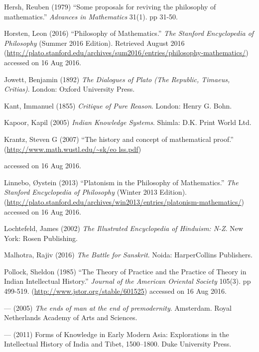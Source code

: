 \begin{thebibliography}{99}
Hersh, Reuben (1979) ``Some proposals for reviving the philosophy of mathematics.'' {\sl Advances in Mathematics} 31(1). pp 31-50.

Horsten, Leon (2016) ``Philosophy of Mathematics.'' {\sl The Stanford Encyclopedia of Philosophy} (Summer 2016 Edition). Retrieved August 2016 (\url{http://plato.stanford.edu/archives/sum2016/entries/philosophy-mathematics/}) accessed on 16 Aug 2016.

Jowett, Benjamin (1892) {\sl The Dialogues of Plato (The Republic, Timaeus, Critias)}. London: Oxford University Press.

Kant, Immanuel (1855) {\sl Critique of Pure Reason}. London: Henry G. Bohn. 

Kapoor, Kapil (2005) {\sl Indian Knowledge Systems}. Shimla: D.K. Print World Ltd.

Krantz, Steven G (2007) ``The history and concept of mathematical proof.'' (\url{http://www.math.wustl.edu/~sk/eo lss.pdf})

accessed on 16 Aug 2016.

Linnebo, Øystein (2013) ``Platonism in the Philosophy of Mathematics.'' {\sl The Stanford Encyclopedia of Philosophy} (Winter 2013 Edition). (\url{http://plato.stanford.edu/archives/win2013/entries/platonism-mathematics/}) accessed on 16 Aug 2016.

Lochtefeld, James (2002) {\sl The Illustrated Encyclopedia of Hinduism: N-Z}. New York: Rosen Publishing.

Malhotra, Rajiv (2016) {\sl The Battle for Sanskrit}. Noida: HarperCollins Publishers.

Pollock, Sheldon (1985) ``The Theory of Practice and the Practice of Theory in Indian Intellectual History.'' {\sl Journal of the American Oriental Society} 105(3). pp 499-519. (\url{http://www.jstor.org/stable/601525}) accessed on 16 Aug 2016.

--- (2005) {\sl The ends of man at the end of premodernity}. Amsterdam. Royal Netherlands Academy of Arts and Sciences.

--- (2011) Forms of Knowledge in Early Modern Asia: Explorations in the Intellectual History of India and Tibet, 1500--1800. Duke University Press.


\end{thebibliography}
